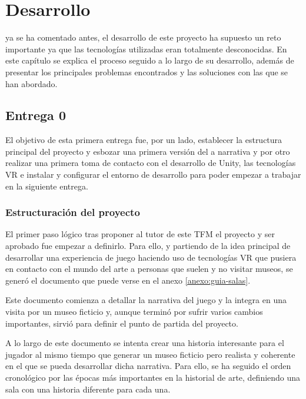 \chapter{Desarrollo}
\label{chap:desarrollo}

 ya se ha comentado antes, el desarrollo de este proyecto ha supuesto un reto importante ya que las tecnologías utilizadas eran totalmente desconocidas. En este capítulo se explica el proceso seguido a lo largo de su desarrollo, además de presentar los principales problemas encontrados y las soluciones con las que se han abordado.

\section{Entrega 0}

El objetivo de esta primera entrega fue, por un lado, establecer la estructura principal del proyecto y esbozar una primera versión del a narrativa y por otro realizar una primera toma de contacto con el desarrollo de Unity, las tecnologías \acs{VR} e instalar y configurar el entorno de desarrollo para poder empezar a trabajar en la siguiente entrega.

\subsection{Estructuración del proyecto}

El primer paso lógico tras proponer al tutor de este \acs{TFM} el proyecto y ser aprobado fue empezar a definirlo. Para ello, y partiendo de la idea principal de desarrollar una experiencia de juego haciendo uso de tecnologías \acs{VR} que pusiera en contacto con el mundo del arte a personas que suelen y no visitar museos, se generó el documento que puede verse en el anexo \ref{anexo:guia-salas}. 

Este documento comienza a detallar la narrativa del juego y la integra en una visita por un museo ficticio y, aunque terminó por sufrir varios cambios importantes, sirvió para definir el punto de partida del proyecto.

A lo largo de este documento se intenta crear una historia interesante para el jugador al mismo tiempo que generar un museo ficticio pero realista y coherente en el que se pueda desarrollar dicha narrativa. Para ello, se ha seguido el orden cronológico por las épocas más importantes en la historial de arte, definiendo una sala con una historia diferente para cada una.

